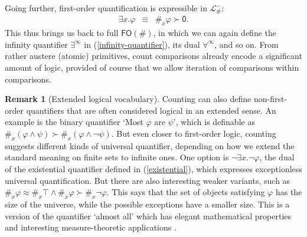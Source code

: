 \documentclass[12pt,oneside,reqno]{amsart}
\theoremstyle{definition}
\newtheorem{remark}{Remark}
\begin{document}
Going further, first-order quantification is expressible in $\mathcal{L}_\#^-$:
\begin{eqnarray}
\exists x. \varphi & \equiv & \#_x\varphi \succ \mathsf{0}. \label{existential}
\end{eqnarray} This thus brings us back to full $\mathsf{FO}(\#)$, in which we can again define the infinity quantifier $\exists^\infty$ in (\ref{infinity-quantifier}), its dual $\forall^\infty$, and so on. From rather austere (atomic) primitives, count comparisons already encode a significant amount of logic, provided of course that we allow iteration of comparisons within comparisons.

\begin{remark}[Extended logical vocabulary] Counting can also define non-first-order quantifiers that are often considered logical in an extended sense. An example is the binary quantifier `Most $\varphi$ are $\psi$', which is definable as $\#_x(\varphi \land \psi) \succ \#_x(\varphi \land \neg\psi)$. But even closer to first-order logic, counting suggests different kinds of universal quantifier, depending on how we extend the standard meaning on finite sets to infinite ones. One option is $\neg \exists x. \neg\varphi$, the dual of the existential quantifier defined in (\ref{existential}), which expresses exceptionless  universal quantification. But there are also interesting weaker variants, such as  $\#_x\varphi \approx \#_x\top \wedge \#_x\varphi\succ \#_x\neg\varphi$. This says that the set of objects satisfying $\varphi$ has the size of the universe, while the possible exceptions have a smaller size. This is a  version of the quantifier `almost all' which has elegant mathematical properties and interesting measure-theoretic applications \citep{STEINHORN1985161}.
\end{remark}
\end{document}
